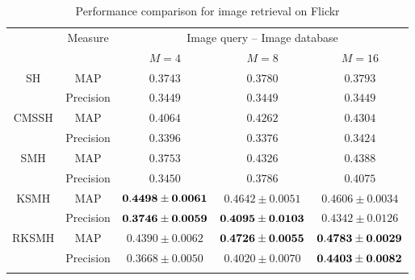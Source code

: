 \begin{table}[htb]\small
\caption{Performance comparison for image retrieval on \mbox{Flickr}}\label{table:comp-flickr-uni-ii}\vspace{-0.5cm}
\begin{center}
\begin{tabular}{|c|c|c|c|c|}
\toprule[1pt]\addlinespace[0pt]
    \multirow{2}{*}{Method}&  \multirow{2}{*}{Measure}  &  \multicolumn{3}{|c|}{Image query -- Image database}  \\
\cline{3-5}%
&&$M=4$&$M=8$&$M=16$\\
\hline
\multirow{2}{*}{SH}&{MAP}    &     $0.3743$          &  $0.3780$ &$0.3793  $\\
\cline{2-5}%
&{Precision}    &       $0.3449$        &      $0.3449$       &$0.3449$ \\
\hline %
\multirow{2}{*}{CMSSH}&{MAP}    &    $0.4064  $           &  $   0.4262  $ &$ 0.4304$  \\
\cline{2-5}%
&{Precision}    &     	$0.3396   $         &     $ 0.3376  $         &        $  0.3424$       \\
\hline%
\multirow{2}{*}{SMH}&MAP        &     $0.3753 $         &     $   0.4326  $      &  $  0.4388$ \\
\cline{2-5}%
&{Precision}    &     	$0.3450 $         &   $   0.3786  $            &    $  0.4075$         \\
\hline%
\multirow{2}{*}{KSMH}&MAP        &   ${\bf 0.4498   \pm 0.0061 } $       &  $   0.4642 \pm   0.0051  $         & $ 0.4606\pm  0.0034$  \\
\cline{2-5}%
&{Precision}    &     	${\bf 0.3746 \pm0.0059 } $         & $ {\bf 0.4095  \pm   0.0103}   $              &  $  0.4342\pm  0.0126$       \\
\hline%
\multirow{2}{*}{RKSMH}&MAP        &     $0.4390 \pm0.0062 $         & $ {\bf  0.4726  \pm 0.0055}   $          & $ {\bf  0.4783\pm    0.0029}$  \\
\cline{2-5}%
&{Precision}    &    	$0.3668 \pm0.0050 $          &    $  0.4020   \pm   0.0070 $           &    $ {\bf  0.4403\pm   0.0082}$         \\
\addlinespace[0pt]\bottomrule[1pt]
\end{tabular}
\end{center}
\end{table}

